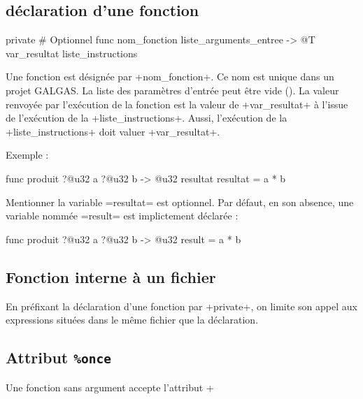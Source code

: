 \subsection{déclaration d'une fonction}

\begin{galgas4}
private # Optionnel
func nom_fonction liste_arguments_entree -> @T var_resultat {
  liste_instructions
}
\end{galgas4}

Une fonction est désignée par \ggsq+nom_fonction+. Ce nom est unique dans un projet GALGAS. La liste des paramètres d'entrée peut être vide (). La valeur renvoyée par l'exécution de la fonction est la valeur de \ggsq+var_resultat+ à l'issue de l'exécution de la \ggsq+liste_instructions+. Aussi, l'exécution de la \ggsq+liste_instructions+ doit valuer \ggsq+var_resultat+.

Exemple :

\begin{galgas4}
func produit ?@u32 a ?@u32 b -> @u32 resultat {
  resultat = a * b
}
\end{galgas4}

Mentionner la variable \ggsq=resultat= est optionnel. Par défaut, en son absence, une variable nommée \ggsq=result= est implictement déclarée :

\begin{galgas4}
func produit ?@u32 a ?@u32 b -> @u32 {
  result = a * b
}
\end{galgas4}




\subsection{Fonction interne à un fichier}

En préfixant la déclaration d'une fonction par \ggsq+private+, on limite son appel aux expressions situées dans le même fichier que la déclaration.




\subsection{Attribut \texttt{\%once}}

Une fonction sans argument accepte l'attribut \ggsq+%



